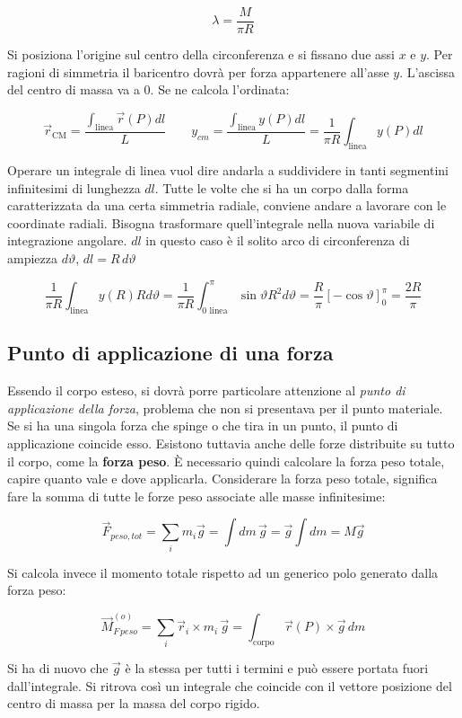 \[
	\lambda = \frac{M}{\pi R}
\]

Si posiziona l'origine sul centro della circonferenza e si fissano due assi $x$ e $y$. Per ragioni di simmetria il baricentro dovrà per forza appartenere all'asse $y$. L'ascissa del centro di massa va a $0$. Se ne calcola l'ordinata:

\[
	\vec{r}_\text{CM} = \frac{\int_{\text{linea} } \vec{r} (P)dl}{L} \qquad y_{cm}=\frac{\int_{\text{linea} }y(P)dl}{L} = \frac{1}{\pi R} \int_{\text{linea} } y(P) dl
\]

Operare un integrale di linea vuol dire andarla a suddividere in tanti segmentini infinitesimi di lunghezza $dl$. Tutte le volte che si ha un corpo dalla forma caratterizzata da una certa simmetria radiale, conviene andare a lavorare con le coordinate radiali. Bisogna trasformare quell'integrale nella nuova variabile di integrazione angolare.
$dl$ in questo caso è il solito arco di circonferenza di ampiezza $d\vartheta$, $dl=R\,d\vartheta$

\[
	\frac{1}{\pi R}\int_{\text{linea}} y(R)Rd\vartheta = \frac{1}{\pi R}\int_{0\text{ linea} }^{\pi } \sin \vartheta R^2 d\vartheta = \frac{R}{\pi }[-\cos \vartheta ]_0^{\pi } = \frac{2R}{\pi}
\]

\subsection{Punto di applicazione di una forza}

Essendo il corpo esteso, si dovrà porre particolare attenzione al \emph{punto di applicazione della forza}, problema che non si presentava per il punto materiale. Se si ha una singola forza che spinge o che tira in un punto, il punto di applicazione coincide esso. Esistono tuttavia anche delle forze distribuite su tutto il corpo, come la \textbf{forza peso}. È necessario quindi calcolare la forza peso totale, capire quanto vale e dove applicarla.
Considerare la forza peso totale, significa fare la somma di tutte le forze peso associate alle masse infinitesime:

\[
	\vec{F}_{peso,tot} = \sum_i m_i\vec{g} = \int dm\,\vec{g} = \vec{g} \int dm = M\vec{g}
\]

Si calcola invece il momento totale rispetto ad un generico polo generato dalla forza peso:

\[
	\vec{M}^{(o)}_{F\,peso} = \sum_i \vec{r}_i \times m_i\,\vec{g} = \int_{\text{corpo}}\vec{r} (P)\times \vec{g} \,dm
\]

Si ha di nuovo che $\vec{g}$ è la stessa per tutti i termini e può essere portata fuori dall'integrale. Si ritrova così un integrale che coincide con il vettore posizione del centro di massa per la massa del corpo rigido.

